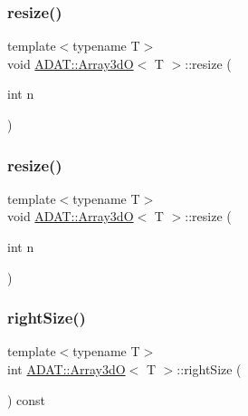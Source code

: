 \subsubsection{\texorpdfstring{resize()}{resize()}\hspace{0.1cm}{\footnotesize\ttfamily [3/4]}}
{\footnotesize\ttfamily template$<$typename T$>$ \\
void \mbox{\hyperlink{classADAT_1_1Array3dO}{A\+D\+A\+T\+::\+Array3dO}}$<$ T $>$\+::resize (\begin{DoxyParamCaption}\item[{int}]{n }\end{DoxyParamCaption})\hspace{0.3cm}{\ttfamily [inline]}}

\mbox{\label{classADAT_1_1Array3dO_ade806f07a366f5217783998dda678b6f}} 
\subsubsection{\texorpdfstring{resize()}{resize()}\hspace{0.1cm}{\footnotesize\ttfamily [4/4]}}
{\footnotesize\ttfamily template$<$typename T$>$ \\
void \mbox{\hyperlink{classADAT_1_1Array3dO}{A\+D\+A\+T\+::\+Array3dO}}$<$ T $>$\+::resize (\begin{DoxyParamCaption}\item[{int}]{n }\end{DoxyParamCaption})\hspace{0.3cm}{\ttfamily [inline]}}

\mbox{\label{classADAT_1_1Array3dO_a81a9bfa7afe224267642e822ebe09457}} 
\subsubsection{\texorpdfstring{rightSize()}{rightSize()}\hspace{0.1cm}{\footnotesize\ttfamily [1/2]}}
{\footnotesize\ttfamily template$<$typename T$>$ \\
int \mbox{\hyperlink{classADAT_1_1Array3dO}{A\+D\+A\+T\+::\+Array3dO}}$<$ T $>$\+::right\+Size (\begin{DoxyParamCaption}{ }\end{DoxyParamCaption}) const\hspace{0.3cm}{\ttfamily [inline]}}

